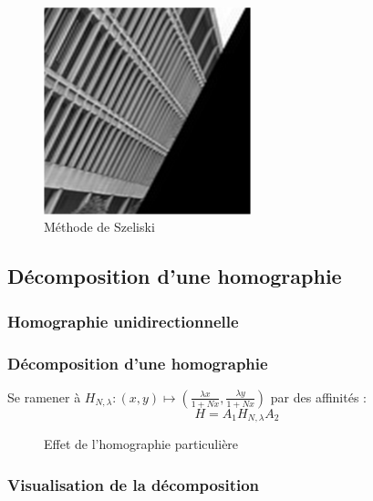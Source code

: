 \documentclass[c,12pt]{beamer}
\newcommand{\subfig}[1]{\subfigure{\texttt{[image: \#1]}}}
\newcommand{\arrow}{{\raisebox{15\height}{\scalebox{1}{$\longrightarrow$}}}}
\begin{document}
\begin{frame}
\begin{figure}
\centering
\includegraphics[width=6cm]{zoom_shear_pas_aliase.png}
\caption{Méthode de Szeliski}
\end{figure}
\end{frame}


 \subsection{Décomposition d'une homographie}

  \subsubsection{Homographie unidirectionnelle}

  \begin{frame} %
  \frametitle{Décomposition d'une homographie}
   Se ramener à  $H_{N,\lambda} : (x,y) \mapsto \left(\frac{\lambda x}{1+Nx},\frac{\lambda y}{1+Nx}\right)$ par des affinités :
   \[H = A_1 H_{N,\lambda} A_2\]
   \begin{figure}
    \centering
  \subfig{balloon}
    \arrow
    \subfig{Image_homo_particuliere_opt}
    \caption{Effet de l'homographie particulière}
   \end{figure}
  \end{frame}
  

  
\subsubsection{Visualisation de la décomposition}
\end{document}
